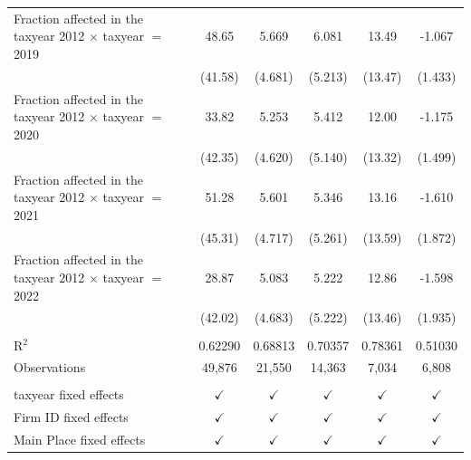 \begin{tabular}{lccccc}
   Fraction affected in the taxyear 2012 $\times$ taxyear $=$ 2019  & 48.65         & 5.669         & 6.081         & 13.49         & -1.067\\   
                                                                    & (41.58)       & (4.681)       & (5.213)       & (13.47)       & (1.433)\\   
   Fraction affected in the taxyear 2012 $\times$ taxyear $=$ 2020  & 33.82         & 5.253         & 5.412         & 12.00         & -1.175\\   
                                                                    & (42.35)       & (4.620)       & (5.140)       & (13.32)       & (1.499)\\   
   Fraction affected in the taxyear 2012 $\times$ taxyear $=$ 2021  & 51.28         & 5.601         & 5.346         & 13.16         & -1.610\\   
                                                                    & (45.31)       & (4.717)       & (5.261)       & (13.59)       & (1.872)\\   
   Fraction affected in the taxyear 2012 $\times$ taxyear $=$ 2022  & 28.87         & 5.083         & 5.222         & 12.86         & -1.598\\   
                                                                    & (42.02)       & (4.683)       & (5.222)       & (13.46)       & (1.935)\\   
    \\
   R$^2$                                                            & 0.62290       & 0.68813       & 0.70357       & 0.78361       & 0.51030\\  
   Observations                                                     & 49,876        & 21,550        & 14,363        & 7,034         & 6,808\\  
    \\
   taxyear fixed effects                                            & $\checkmark$  & $\checkmark$  & $\checkmark$  & $\checkmark$  & $\checkmark$\\   
   Firm ID fixed effects                                            & $\checkmark$  & $\checkmark$  & $\checkmark$  & $\checkmark$  & $\checkmark$\\   
   Main Place fixed effects                                         & $\checkmark$  & $\checkmark$  & $\checkmark$  & $\checkmark$  & $\checkmark$\\   
   \bottomrule
\end{tabular}
\par\endgroup
